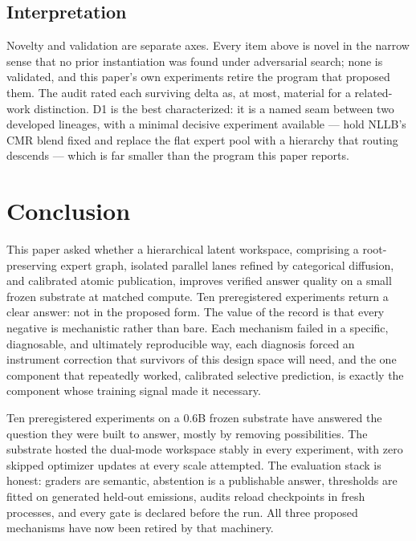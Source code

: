 \documentclass[10pt,a4paper]{article}
\begin{document}
\subsection{Interpretation}

Novelty and validation are separate axes. Every item above is novel in the
narrow sense that no prior instantiation was found under adversarial search;
none is validated, and this paper's own experiments retire the program that
proposed them. The audit rated each surviving delta as, at most, material
for a related-work distinction. D1 is the best characterized: it is a named
seam between two developed lineages, with a minimal decisive experiment
available --- hold NLLB's CMR blend fixed and replace the flat expert pool
with a hierarchy that routing descends --- which is far smaller than the
program this paper reports.

\section{Conclusion}
\label{sec:conclusion}

This paper asked whether a hierarchical latent workspace, comprising a
root-preserving expert graph, isolated parallel lanes refined by categorical
diffusion, and calibrated atomic publication, improves verified answer
quality on a small frozen substrate at matched compute. Ten preregistered
experiments return a clear answer: not in the proposed form. The value of
the record is that every negative is mechanistic rather than bare. Each
mechanism failed in a specific, diagnosable, and ultimately reproducible
way, each diagnosis forced an instrument correction that survivors of this
design space will need, and the one component that repeatedly worked,
calibrated selective prediction, is exactly the component whose training
signal made it necessary.

Ten preregistered experiments on a 0.6B frozen substrate have answered the
question they were built to answer, mostly by removing possibilities. The
substrate hosted the dual-mode workspace stably in every experiment, with zero
skipped optimizer updates at every scale attempted. The evaluation stack is
honest: graders are semantic, abstention is a publishable answer, thresholds
are fitted on generated held-out emissions, audits reload checkpoints in
fresh processes, and every gate is declared before the run. All three
proposed mechanisms have now been retired by that machinery.
\end{document}
